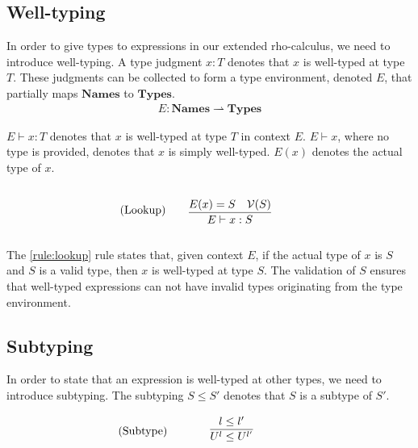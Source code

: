 \subsection{Well-typing}
In order to give types to expressions in our extended rho-calculus, we need to introduce well-typing.
A type judgment $x:T$ denotes that $x$ is well-typed at type $T$.
These judgments can be collected to form a type environment, denoted $E$, that partially maps $\mathbf{Names}$ to $\mathbf{Types}$.
\begin{align*}
E: \mathbf{Names} \rightharpoonup \mathbf{Types}
\end{align*}

\noindent $E\vdash x:T$ denotes that $x$ is well-typed at type $T$ in context $E$.
$E\vdash x$, where no type is provided, denotes that $x$ is simply well-typed.
$E(x)$ denotes the actual type of $x$.

\begin{align*}
\tag{Lookup}\label{rule:lookup} &\infrule{E(x)=S\quad\valid{S}}{E\vdash x:S}
\end{align*}

The \ref{rule:lookup} rule states that, given context $E$, if the actual type of $x$ is $S$ and $S$ is a valid type, then $x$ is well-typed at type $S$.
The validation of $S$ ensures that well-typed expressions can not have invalid types originating from the type environment.

\subsection{Subtyping}
In order to state that an expression is well-typed at other types, we need to introduce subtyping.
The subtyping $S\leq S'$ denotes that $S$ is a subtype of $S'$. 





\begin{align*}
\tag{Subtype}\label{rule:subtype} &\infrule{l\leq l'}{U^l\leq U^{l'}}
\end{align*}


